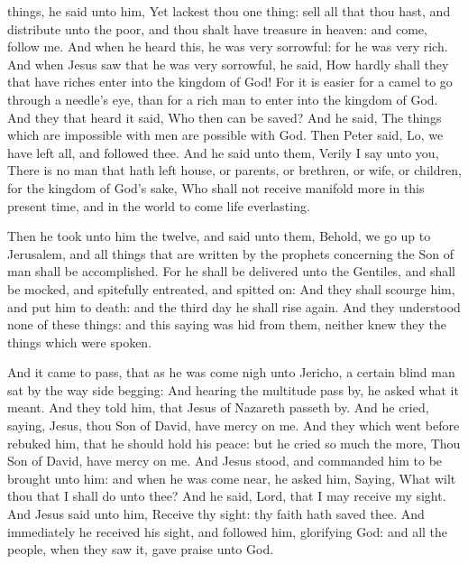 things, he said unto him, Yet lackest thou one thing: sell all that thou
hast, and distribute unto the poor, and thou shalt have treasure in
heaven: and come, follow me.  And when he heard this, he
was very sorrowful: for he was very rich.  And when Jesus
saw that he was very sorrowful, he said, How hardly shall they that have
riches enter into the kingdom of God!  For it is easier
for a camel to go through a needle's eye, than for a rich man to enter
into the kingdom of God.  And they that heard it said,
Who then can be saved?  And he said, The things which are
impossible with men are possible with God.  Then Peter
said, Lo, we have left all, and followed thee.  And he
said unto them, Verily I say unto you, There is no man that hath left
house, or parents, or brethren, or wife, or children, for the kingdom of
God's sake,  Who shall not receive manifold more in this
present time, and in the world to come life everlasting.

 Then he took unto him the twelve, and said unto them,
Behold, we go up to Jerusalem, and all things that are written by the
prophets concerning the Son of man shall be accomplished.
 For he shall be delivered unto the Gentiles, and shall
be mocked, and spitefully entreated, and spitted on:  And
they shall scourge him, and put him to death: and the third day he shall
rise again.  And they understood none of these things:
and this saying was hid from them, neither knew they the things which
were spoken.

 And it came to pass, that as he was come nigh unto
Jericho, a certain blind man sat by the way side begging:
 And hearing the multitude pass by, he asked what it
meant.  And they told him, that Jesus of Nazareth passeth
by.  And he cried, saying, Jesus, thou Son of David, have
mercy on me.  And they which went before rebuked him,
that he should hold his peace: but he cried so much the more, Thou Son
of David, have mercy on me.  And Jesus stood, and
commanded him to be brought unto him: and when he was come near, he
asked him,  Saying, What wilt thou that I shall do unto
thee? And he said, Lord, that I may receive my sight. 
And Jesus said unto him, Receive thy sight: thy faith hath saved thee.
 And immediately he received his sight, and followed him,
glorifying God: and all the people, when they saw it, gave praise unto
God.

